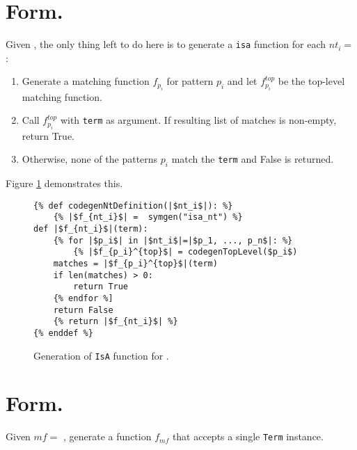 \section{\DefineLanguageNoArg \space Form.}
Given \DefineLanguage, the only thing left to do here is to generate a \texttt{isa} function for each $nt_i=$\NtDefinition:
\begin{enumerate}
\item Generate a matching function $f_{p_i}$ for pattern $p_i$ and let $f_{p_i}^{top}$ be the top-level matching function.
\item Call $f_{p_i}^{top}$ with \texttt{term} as argument. If resulting list of matches is non-empty, return True.
\item Otherwise, none of the patterns $p_i$ match the \texttt{term} and False is returned.
\end{enumerate}

Figure \ref{codegen-ntdef} demonstrates this.

\begin{figure}
\begin{verbatim}
{% def codegenNtDefinition(|$nt_i$|): %}
	{% |$f_{nt_i}$| =  symgen("isa_nt") %}
def |$f_{nt_i}$|(term):
	{% for |$p_i$| in |$nt_i$|=|$p_1, ..., p_n$|: %}
		{% |$f_{p_i}^{top}$| = codegenTopLevel($p_i$)
	matches = |$f_{p_i}^{top}$|(term)
	if len(matches) > 0:
		return True
	{% endfor %]
	return False
	{% return |$f_{nt_i}$| %}
{% enddef %}
\end{verbatim}
\caption{Generation of \texttt{IsA} function for \NtDefinitionNoArgs.}
\label{codegen-ntdef}
\end{figure}

\section{\DefineMetafunctionNoArgs \space Form.}

Given $mf=$ \DefineMetafunction, generate a function $f_{mf}$ that accepts a single \texttt{Term} instance.


